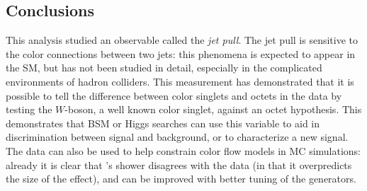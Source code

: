 



\subsection{Conclusions}

This analysis studied an observable called the \textit{jet pull}. The jet pull is sensitive to the color connections between two jets: this phenomena is expected to appear in the SM, but has not been studied in detail, especially in the complicated environments of hadron colliders. This measurement has demonstrated that it is possible to tell the difference between color singlets and octets in the data by testing the $W$-boson, a well known color singlet, against an octet hypothesis. This demonstrates that BSM or Higgs searches can use this variable to aid in discrimination between signal and background, or to characterize a new signal. The data can also be used to help constrain color flow models in MC simulations: already it is clear that \Pythia's shower disagrees with the data (in that it overpredicts the size of the effect), and can be improved with better tuning of the generators.

